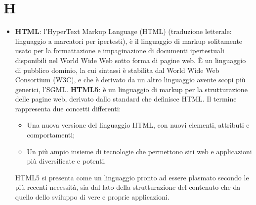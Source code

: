 \section{H}
\begin{itemize} 
	\item
	\textbf{HTML}: l'HyperText Markup Language (HTML) (traduzione letterale: linguaggio a marcatori per ipertesti), è il linguaggio di markup solitamente usato per la formattazione e impaginazione di documenti ipertestuali disponibili nel World Wide Web sotto forma di pagine web.
	È un linguaggio di pubblico dominio, la cui sintassi è stabilita dal World Wide Web Consortium (W3C), e che è derivato da un altro linguaggio avente scopi più generici, l'SGML. 
	\textbf{HTML5}: è un linguaggio di markup per la strutturazione delle pagine web, derivato dallo standard che definisce HTML.
	Il termine rappresenta due concetti differenti:
	\begin{itemize}
		\item
		Una nuova versione del linguaggio HTML, con nuovi elementi, attributi e comportamenti;
		\item
		Un più ampio insieme di tecnologie che permettono siti web e applicazioni più diversificate e potenti.
	\end{itemize}
	HTML5 si presenta come un linguaggio pronto ad essere plasmato secondo le più recenti necessità, sia dal lato della strutturazione del contenuto che da quello dello sviluppo di vere e proprie applicazioni.
\end{itemize}
